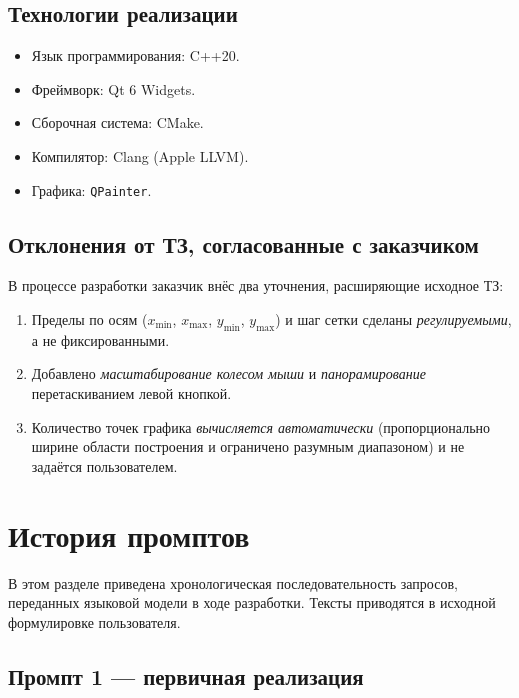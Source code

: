 \documentclass[a4paper, final]{article}
\begin{document}
\subsection{Технологии реализации}

\begin{itemize}
    \item Язык программирования: C++20.
    \item Фреймворк: Qt 6 Widgets.
    \item Сборочная система: CMake.
    \item Компилятор: Clang (Apple LLVM).
    \item Графика: \texttt{QPainter}.
\end{itemize}

\subsection{Отклонения от ТЗ, согласованные с заказчиком}

В процессе разработки заказчик внёс два уточнения, расширяющие исходное ТЗ:
\begin{enumerate}
    \item Пределы по осям ($x_{\min}$, $x_{\max}$, $y_{\min}$, $y_{\max}$)
          и шаг сетки сделаны \emph{регулируемыми}, а не фиксированными.
    \item Добавлено \emph{масштабирование колесом мыши} и
          \emph{панорамирование} перетаскиванием левой кнопкой.
    \item Количество точек графика \emph{вычисляется автоматически}
          (пропорционально ширине области построения и ограничено
          разумным диапазоном) и не задаётся пользователем.
\end{enumerate}

\newpage

\section{История промптов}

В этом разделе приведена хронологическая последовательность запросов,
переданных языковой модели в ходе разработки. Тексты приводятся
в исходной формулировке пользователя.

\subsection{Промпт 1 --- первичная реализация}
\end{document}
